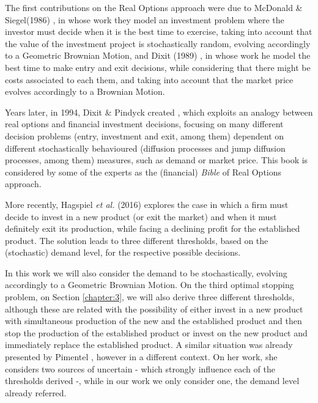 The first contributions on the Real Options approach were due to McDonald \& Siegel(1986) \cite{siegel}, in whose work they model an investment problem where the investor must decide when it is the best time to exercise, taking into account that the value of the investment project is stochastically random, evolving accordingly to a Geometric Brownian Motion, and Dixit (1989) \cite{dixit_alone}, in whose work he model the best time to make entry and exit decisions, while considering that there might be costs associated to each them, and taking into account that the market price evolves accordingly to a Brownian Motion.

Years later, in 1994, Dixit \& Pindyck created \cite{dixit:book}, which exploits an analogy between real options and financial investment decisions, focusing on many different decision problems (entry, investment and exit, among them) dependent on different stochastically behavioured (diffusion processes and jump diffusion processes, among them) measures, such as demand or market price. This book is considered by some of the experts as the (financial) \textit{Bible} of Real Options approach. 

More recently, Hagspiel \textit{et al.} (2016) \cite{hagspiel:cap} explores the case in which a firm must decide to invest in a new product (or exit the market) and when it must definitely exit its production, while facing a declining profit for the established product. The solution leads to three different thresholds, based on the (stochastic) demand level, for the respective possible decisions.

In this work we will also consider the demand to be stochastically, evolving accordingly to a Geometric Brownian Motion. On the third optimal stopping problem, on Section \ref{chapter:3}, we will also derive three different thresholds, although these are related with the possibility of either invest in a new product with simultaneous production of the new and the established product and then stop the production of the established product or invest on the new product and immediately replace the established product. A similar situation was already presented by Pimentel \cite{rita}, however in a different context. On her work, she considers two sources of uncertain - which strongly influence each of the thresholds derived -, while in our work we only consider one, the demand level already referred. 


